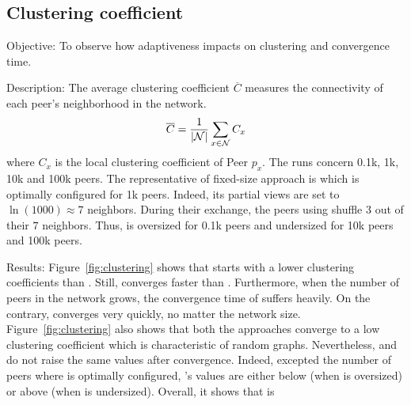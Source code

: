 \subsection{Clustering coefficient}
\label{subsec:cluster}


\begin{asparadesc}
\item[Objective:] To observe how adaptiveness impacts on clustering and
  convergence time.
\item[Description:] The average clustering coefficient $\overline{C}$ measures
  the connectivity of each peer's neighborhood in the network.
  \begin{equation}
    \overline{C} = {1\over |\mathcal{N}|}\sum\limits_{x\in\mathcal{N}}C_x
  \end{equation}
  where $C_x$ is the local clustering coefficient of Peer $p_x$.  The runs
  concern 0.1k, 1k, 10k and 100k peers. The representative of fixed-size
  approach is \CYCLON which is optimally configured for 1k peers. Indeed, its
  partial views are set to $\ln(1000)\approx 7$ neighbors. During their
  exchange, the peers using \CYCLON shuffle $3$ out of their $7$
  neighbors. Thus, \CYCLON is oversized for 0.1k peers and undersized for 10k
  peers and 100k peers.
\item[Results:] Figure~\ref{fig:clustering} shows that \CYCLON starts with a
  lower clustering coefficients than \SPRAY. Still, \SPRAY converges faster
  than \CYCLON. Furthermore, when the number of peers in the network grows, the
  convergence time of \CYCLON suffers heavily. On the contrary, \SPRAY
  converges very quickly, no matter the network
  size. Figure~\ref{fig:clustering} also shows that both the approaches
  converge to a low clustering coefficient which is characteristic of random
  graphs. Nevertheless, \CYCLON and \SPRAY do not raise the same values after
  convergence. Indeed, excepted the number of peers where \CYCLON is optimally
  configured, \SPRAY's values are either below (when \CYCLON is oversized) or
  above (when \CYCLON is undersized).  Overall, it shows that \SPRAY is
  \begin{inparaenum}

\end{inparaenum}
\end{asparadesc}
